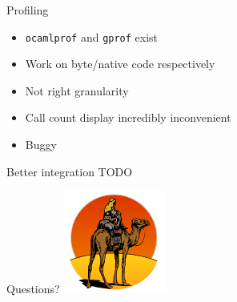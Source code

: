 \documentclass{beamer}
\begin{document}
\begin{frame}{Profiling}
  \begin{itemize}
    \item \texttt{ocamlprof} and \texttt{gprof} exist
    \item Work on byte/native code respectively
    \item Not right granularity
    \item Call count display incredibly inconvenient
    \item Buggy
  \end{itemize}
\end{frame}

\begin{frame}{Better integration}
  TODO
\end{frame}

\begin{frame}{Questions?}
  \centering
  \includegraphics[height=.85\textheight]{camel}
\end{frame}
\end{document}
